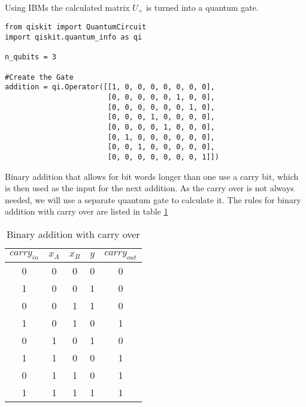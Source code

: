 Using IBMs  the calculated matrix $U_{+}$ is turned into a quantum gate.

\begin{verbatim}
from qiskit import QuantumCircuit
import qiskit.quantum_info as qi

n_qubits = 3

#Create the Gate
addition = qi.Operator([[1, 0, 0, 0, 0, 0, 0, 0],
                        [0, 0, 0, 0, 0, 1, 0, 0],
                        [0, 0, 0, 0, 0, 0, 1, 0],
                        [0, 0, 0, 1, 0, 0, 0, 0],
                        [0, 0, 0, 0, 1, 0, 0, 0],
                        [0, 1, 0, 0, 0, 0, 0, 0],
                        [0, 0, 1, 0, 0, 0, 0, 0],
                        [0, 0, 0, 0, 0, 0, 0, 1]])
\end{verbatim}

Binary addition that allows for bit words longer than one use a carry bit, which is then used as the input for the next addition. As the carry over is not always needed, we will use a separate quantum gate to calculate it. The rules for binary addition with carry over are listed in table \ref{table:binary_addition_carry_over}

\begin{table}[!h]
    \centering
    \begin{tabular}{|c|c|c|c|c|}
        \hline
        $carry_{in}$ & $x_A$ & $x_B$ & $y$ & $carry_{out}$ \\ \hline
        0             & 0     & 0     & 0   & 0              \\ \hline
        1             & 0     & 0     & 1   & 0              \\ \hline
        0             & 0     & 1     & 1   & 0              \\ \hline
        1             & 0     & 1     & 0   & 1              \\ \hline
        0             & 1     & 0     & 1   & 0              \\ \hline
        1             & 1     & 0     & 0   & 1              \\ \hline
        0             & 1     & 1     & 0   & 1              \\ \hline
        1             & 1     & 1     & 1   & 1              \\ \hline
        \end{tabular}
    \caption{Binary addition with carry over}
    \label{table:binary_addition_carry_over}
\end{table}

